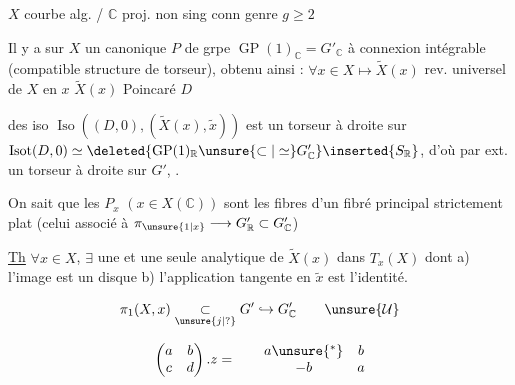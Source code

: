 
$X$ courbe alg. / $\mathbb C$ proj. non sing conn genre $g\geq2$

Il y a sur $X$ un  canonique
$P$ de grpe $\operatorname{GP}(1)_{\mathbb C}=G'_{\mathbb C}$ à connexion intégrable
(compatible  structure de torseur), obtenu
ainsi : $\forall x\in X\longmapsto\widetilde X(x)$ rev. universel de $X$ en $x$
$\widetilde X(x)$ \deleted{$\unsure{\longleftrightarrow|\simeq|\Longleftrightarrow}$}  Poincaré $D$

 des iso $\operatorname{Iso}((D,0),(\widetilde X(x),\tilde x))$ est un torseur à droite
sur $\operatorname{Isot}(D,0)\simeq\deleted{\operatorname{GP}(1)_{\mathbb R}\unsure{\subset|\simeq}G'_{\mathbb C}}\inserted{S_{\mathbb R}}$, d'où par ext. un
torseur à droite sur $G'$, .

On sait que les $P_x$ $(x\in X(\mathbb C))$ sont les fibres
d'un fibré principal  strictement plat
(celui associé à $\pi_{\unsure{1|x}}\longrightarrow G'_{\mathbb R}\subset G'_{\mathbb C}$)


\uline{Th} $\forall x\in X$, $\exists$ une et une seule 
 analytique de $\widetilde X(x)$ dans
$T_x(X)$ dont a) l'image est un disque
b) l'application tangente en $\tilde x$
est l'identité.

\[
\pi_1(X,x)\underset{\unsure{j|?}}{\subset}G'\hookrightarrow G'_{\mathbb C}
\qquad \unsure{\mathcal U}
\]

\[
\begin{pmatrix}a&b\\c&d\end{pmatrix}.z=
\qquad
\begin{matrix}a\unsure{{}^{\ast}}&b\\-b&a\end{matrix}
\]

